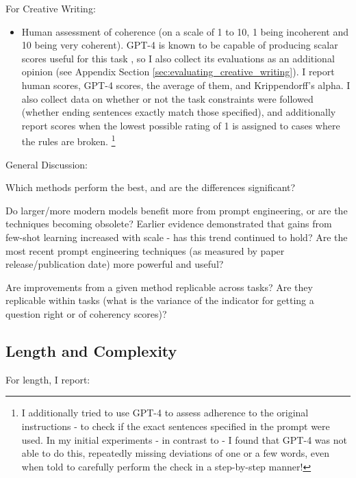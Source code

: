 \documentclass[11pt]{article}
\begin{document}
For Creative Writing:
\begin{itemize}
  \item Human assessment of coherence (on a scale of 1 to 10, 1 being incoherent and 10 being very coherent). GPT-4 is known to be capable of producing scalar scores useful for this task \cite{yao_tree_2023}, so I also collect its evaluations as an additional opinion (see Appendix Section \ref{sec:evaluating_creative_writing}). I report human scores, GPT-4 scores, the average of them, and Krippendorff's alpha. I also collect data on whether or not the task constraints were followed (whether ending sentences exactly match those specified), and additionally report scores when the lowest possible rating of 1 is assigned to cases where the rules are broken. \footnote{I additionally tried to use GPT-4 to assess adherence to the original instructions - to check if the exact sentences specified in the prompt were used. In my initial experiments - in contrast to \citealp{yao_tree_2023} - I found that GPT-4 was not able to do this, repeatedly missing deviations of one or a few words, even when told to carefully perform the check in a step-by-step manner!}
\end{itemize}

General Discussion:

Which methods perform the best, and are the differences significant?

Do larger/more modern models benefit more from prompt engineering, or are the techniques becoming obsolete? Earlier evidence demonstrated that gains from few-shot learning increased with scale - has this trend continued to hold? \cite{brown_language_2020} Are the most recent prompt engineering techniques (as measured by paper release/publication date) more powerful and useful?

Are improvements from a given method replicable across tasks? Are they replicable within tasks (what is the variance of the indicator for getting a question right or of coherency scores)?

\subsection*{Length and Complexity}

For length, I report:
\end{document}
